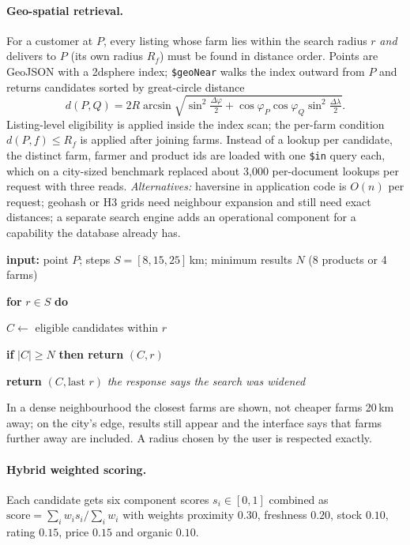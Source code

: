 \documentclass[manuscript,screen,review]{acmart}
\newcounter{pseudoline}
\newenvironment{pseudo}{\small\begin{list}{\scriptsize\arabic{pseudoline}}{\usecounter{pseudoline}\setlength{\itemsep}{1pt}\setlength{\topsep}{3pt}\setlength{\parsep}{0pt}\setlength{\leftmargin}{7mm}}}{\end{list}}
\newcommand{\kw}[1]{\textbf{#1}}
\newcommand{\ind}{\hspace*{5mm}}
\begin{document}
\paragraph{Geo-spatial retrieval.} For a customer at $P$, every listing whose farm lies within the search radius $r$ \emph{and} delivers to $P$ (its own radius $R_f$) must be found in distance order. Points are GeoJSON with a 2dsphere index; \texttt{\$geoNear} walks the index outward from $P$ and returns candidates sorted by great-circle distance
\[
  d(P,Q) = 2R\arcsin\sqrt{\sin^2\tfrac{\Delta\varphi}{2} + \cos\varphi_P\cos\varphi_Q\sin^2\tfrac{\Delta\lambda}{2}}.
\]
Listing-level eligibility is applied inside the index scan; the per-farm condition $d(P,f) \le R_f$ is applied after joining farms. Instead of a lookup per candidate, the distinct farm, farmer and product ids are loaded with one \texttt{\$in} query each, which on a city-sized benchmark replaced about 3{,}000 per-document lookups per request with three reads. \emph{Alternatives:} haversine in application code is $O(n)$ per request; geohash or H3 grids need neighbour expansion and still need exact distances; a separate search engine adds an operational component for a capability the database already has.

\begin{algorithm}[H]
\caption{Adaptive radius selection}
\label{alg:radius}
\begin{pseudo}
  \item \kw{input:} point $P$; steps $S = [8, 15, 25]$\,km; minimum results $N$ (8 products or 4 farms)
  \item \kw{for} $r \in S$ \kw{do}
  \item \ind $C \gets$ eligible candidates within $r$
  \item \ind \kw{if} $|C| \ge N$ \kw{then return} $(C, r)$
  \item \kw{return} $(C, \text{last } r)$ \hfill \emph{the response says the search was widened}
\end{pseudo}
\end{algorithm}

\noindent In a dense neighbourhood the closest farms are shown, not cheaper farms 20\,km away; on the city's edge, results still appear and the interface says that farms further away are included. A radius chosen by the user is respected exactly.

\paragraph{Hybrid weighted scoring.} Each candidate gets six component scores $s_i \in [0,1]$ combined as $\text{score} = \sum_i w_i s_i / \sum_i w_i$ with weights proximity $0.30$, freshness $0.20$, stock $0.10$, rating $0.15$, price $0.15$ and organic $0.10$.
\end{document}
